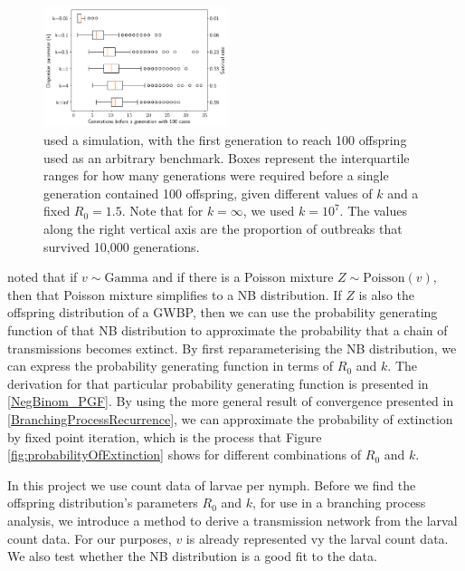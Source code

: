 \documentclass[hidelinks]{article}
\begin{document}
\begin{figure}[]
	\begin{mdframed}[backgroundcolor=grey250,rightline=false,leftline=false,topline=false]
    \includegraphics[width=0.48\textwidth, center]{2c_firstGenerationReach100Offspring.png}
    \caption{\citet{LloydSmith2005} used a simulation, with the first generation to reach 100 offspring used as an arbitrary benchmark. Boxes represent the interquartile ranges for how many generations were required before a single generation contained 100 offspring, given different values of $ k $ and a fixed $ R_0=1.5 $. Note that for $ k = \infty $, we used $ k=10^7 $. The values along the right vertical axis are the proportion of outbreaks that survived 10,000 generations.}
    \label{fig:firstGenerationToReach100Offspring}
	\end{mdframed}
\end{figure}

\citet{LloydSmith2005} noted that if $ v \sim \text{Gamma} $ and if there is a Poisson mixture $ Z \sim \text{Poisson}(v) $, then that Poisson mixture simplifies to a NB distribution. If $ Z $ is also the offspring distribution of a GWBP, then we can use the probability generating function of that NB distribution to approximate the probability that a chain of transmissions becomes extinct. By first reparameterising the NB distribution, we can express the probability generating function in terms of $ R_0 $ and $ k $. The derivation for that particular probability generating function is presented in \eqref{NegBinom_PGF}. By using the more general result of convergence presented in \eqref{BranchingProcessRecurrence}, we can approximate the probability of extinction by fixed point iteration, which is the process that Figure \ref{fig:probabilityOfExtinction} shows for different combinations of $ R_0 $ and $ k $.

In this project we use count data of larvae per nymph. Before we find the offspring distribution's parameters $ R_0 $ and $ k $, for use in a branching process analysis, we introduce a method to derive a transmission network from the larval count data. For our purposes, $ v $ is already represented vy the larval count data. We also test whether the NB distribution is a good fit to the data.
\end{document}
